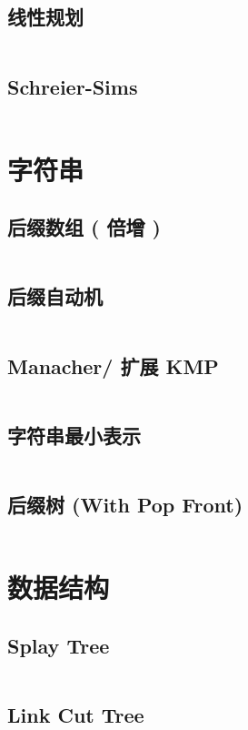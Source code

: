 \documentclass[titlepage,landscape,a4paper,10pt]{article}
\begin{document}
\begin{multicols}{2}
\begin{spacing}{0.8}
\subsection{线性规划}
\inputminted{cpp}{src/线性规划.cpp}

\subsection{Schreier-Sims}
\inputminted{cpp}{improve/SchreierSims.cpp}

\section{字符串}

\subsection{后缀数组 ( 倍增 )}
\inputminted{cpp}{src/后缀数组(nlogn).cpp}

\subsection{后缀自动机}
\inputminted{cpp}{src/后缀自动机.cpp}

\subsection{Manacher/ 扩展 KMP}
\inputminted{cpp}{merge/Manacher.cpp}

\subsection{字符串最小表示}
\inputminted{cpp}{src/字符串最小表示.cpp}

\subsection{后缀树 (With Pop Front)}
\inputminted{cpp}{improve/SuffixTree2.cpp}

\section{数据结构}

\subsection{Splay Tree}
\inputminted{cpp}{src/Splay.cpp}

\subsection{Link Cut Tree}
\inputminted{cpp}{improve/LCT.cpp}


\end{spacing}
\end{multicols}
\end{document}
